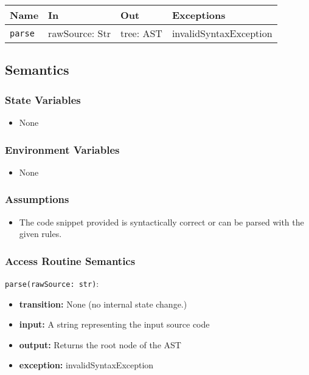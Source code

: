 \documentclass[12pt, titlepage]{article}
\begin{document}
\begin{itemize}
\begin{center}
\begin{tabular}{p{5cm} p{3.5cm} p{3.5cm} p{2cm}}
\hline
\textbf{Name} & \textbf{In} & \textbf{Out} & \textbf{Exceptions} \\
\hline
\texttt{parse} & rawSource: Str & tree: AST  & invalidSyntaxException \\
\hline
\end{tabular}
\end{center}

\subsection{Semantics}

\subsubsection{State Variables}

\begin{itemize}
    \item None
\end{itemize}

\subsubsection{Environment Variables}

\begin{itemize}
  \item None
\end{itemize}

\subsubsection{Assumptions}

\begin{itemize}
    \item The code snippet provided is syntactically correct or can be parsed with the given rules.
\end{itemize}

\subsubsection{Access Routine Semantics}

\noindent \texttt{parse(rawSource: str)}:
\begin{itemize}
    \item \textbf{transition:} None (no internal state change.)
    \item \textbf{input:} A string representing the input source code
    \item \textbf{output:} Returns the root node of the AST
    \item \textbf{exception:} invalidSyntaxException
\end{itemize}


\end{itemize}
\end{document}
